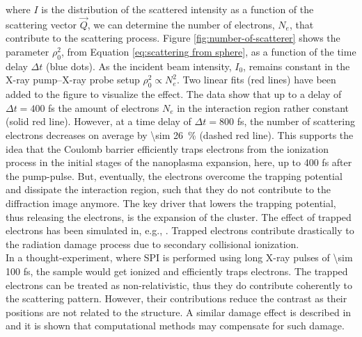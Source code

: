 where $I$ is the distribution of the scattered intensity as a function of the scattering vector $\vec{Q}$, we can determine the number of electrons, $N_{e}$, that contribute to the scattering process. Figure \ref{fig:number-of-scatterer} shows the parameter $\rho_{0}^{2}$, from Equation \eqref{eq:scattering from sphere}, as a function of the time delay $\Delta t$ (blue dots). As the incident beam intensity, $I_{0}$, remains constant in the X-ray pump--X-ray probe setup $\rho_{0}^{2} \propto N_{e}^{2}$. Two linear fits (red lines) have been added to the figure to visualize the effect. The data show that up to a delay of $\Delta t=400$ fs the amount of electrons $N_{e}$ in the interaction region rather constant (solid red line). However, at a time delay of $\Delta t=800$ fs, the number of scattering electrons decreases on average by \SI{\sim 26}{\percent} (dashed red line). This supports the idea that the Coulomb barrier efficiently traps electrons from the ionization process in the initial stages of the nanoplasma expansion, here, up to 400 fs after the pump-pulse. But, eventually, the electrons overcome the trapping potential and dissipate the interaction region, such that they do not contribute to the diffraction image anymore. The key driver that lowers the trapping potential, thus releasing the electrons, is the expansion of the cluster. The effect of trapped electrons has been simulated in, e.g., \citep{Hau-Riege-2004-PRE}. Trapped electrons contribute drastically to the radiation damage process due to secondary collisional ionization.\\[1\baselineskip]
%
In a thought-experiment, where SPI is performed using long X-ray pulses of \num{\sim 100} fs, the sample would get ionized and efficiently traps electrons. The trapped electrons can be treated as non-relativistic, thus they do contribute coherently to the scattering pattern. However, their contributions reduce the contrast as their positions are not related to the structure. A similar damage effect is described in \citep{Quiney-2010-NatPhys} and it is shown that computational methods may compensate for such damage.\\[1\baselineskip]
